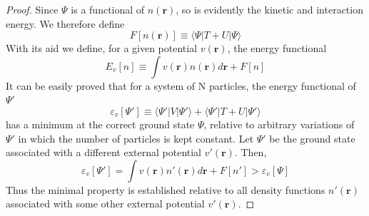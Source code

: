 \documentclass[12pt,a4paper,openany,twoside]{book}
\numberwithin{equation}{section}
\newcommand{\bracketl}[3]{\langle #1 | #2 | #3 \rangle}
\begin{document}
  \begin{proof}
  Since $\Psi$ is a functional of $n(\textbf{r})$, so is evidently the kinetic and interaction energy. We therefore define 
  \begin{equation}
  F[n(\textbf{r})] \equiv \bracketl{\Psi}{T+U}{\Psi}
  \end{equation}
  With its aid we define, for a given potential $v(\textbf{r})$, the energy functional
  \begin{equation}
  E_v[n]\equiv \int v(\textbf{r})n(\textbf{r})d\textbf{r} + F[n]
  \end{equation}
  It can be easily proved that for a system of N particles, the energy functional of $\Psi'$
  \begin{equation}
  \varepsilon_v[\Psi']\equiv\bracketl{\Psi'}{V}{\Psi'}+\bracketl{\Psi'}{T+U}{\Psi'}
  \end{equation}
  has a minimum at the correct ground state $\Psi$, relative to arbitrary variations of $\Psi'$ in which the number of particles is kept constant. Let $\Psi'$ be the ground state associated with a different external potential $v'(\textbf{r})$. Then,
  \begin{equation}
  \varepsilon_v[\Psi']=\int v(\textbf{r})n'(\textbf{r})d\textbf{r}+F[n']>\varepsilon_v[\Psi]
  \end{equation}
  Thus the minimal property is established relative to all density functions $n'(\textbf{r})$ associated with some other external potential $v'(\textbf{r})$.\cite{PhysRev.136.B864}
  \end{proof}
\end{document}
